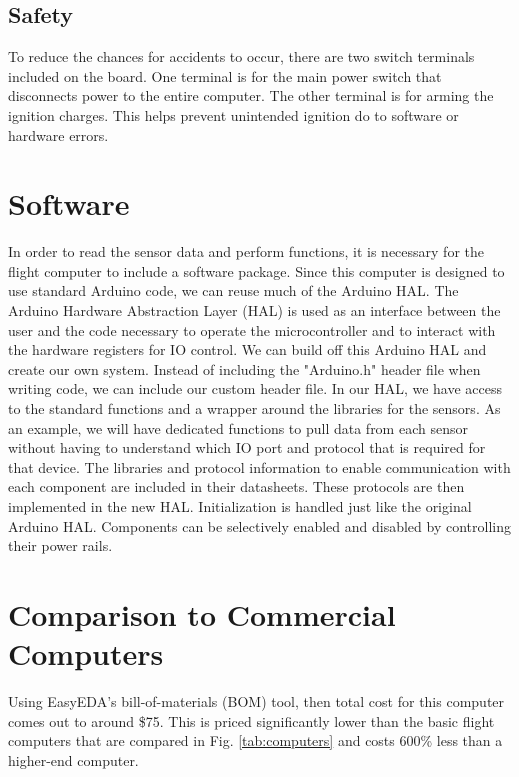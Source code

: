 \documentclass[conf]{new-aiaa}
\begin{document}
\subsection{Safety}

To reduce the chances for accidents to occur, there are two switch terminals included on the board. One terminal is for the main power switch that disconnects power to the entire computer. The other terminal is for arming the ignition charges. This helps prevent unintended ignition do to software or hardware errors.

\section{Software}

In order to read the sensor data and perform functions, it is necessary for the flight computer to include a software package. Since this computer is designed to use standard Arduino code, we can reuse much of the Arduino HAL. The Arduino Hardware Abstraction Layer (HAL) is used as an interface between the user and the code necessary to operate the microcontroller and to interact with the hardware registers for IO control. We can build off this Arduino HAL and create our own system. Instead of including the "Arduino.h" header file when writing code, we can include our custom header file. In our HAL, we have access to the standard functions and a wrapper around the libraries for the sensors. As an example, we will have dedicated functions to pull data from each sensor without having to understand which IO port and protocol that is required for that device. The libraries and protocol information to enable communication with each component are included in their datasheets. These protocols are then implemented in the new HAL. Initialization is handled just like the original Arduino HAL. Components can be selectively enabled and disabled by controlling their power rails.

\section{Comparison to Commercial Computers}
\label{sec:commercial}

Using EasyEDA's bill-of-materials (BOM) tool, then total cost for this computer comes out to around \$75\footnotemark[1]. This is priced significantly lower than the basic flight computers that are compared in Fig. \ref{tab:computers} and costs 600\% less than a higher-end computer.
\end{document}
